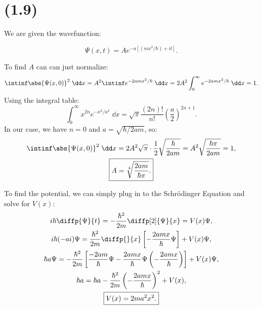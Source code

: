 \section{(1.9)}

We are given the wavefunction:

\begin{equation}
    \Psi(x,t) = Ae^{-a[(mx^2/\hbar) + it]}.
\end{equation}

\begin{parts}
    \item To find $A$ can can just normalize:
        \begin{equation*}
            \intinf \abs{\Psi(x,0)}^2 \;\dd x = A^2 \intinf e^{-2amx^2/\hbar}\;\dd x = 2A^2 \int_0^{\infty} e^{-2amx^2/\hbar} \;\dd x = 1.
        \end{equation*}
        Using the integral table:
        \begin{equation}
            \int_0^{\infty} x^{2n} e^{-x^2/a^2} \;\dd x = \sqrt{\pi} \frac{(2n)!}{n!} \left(\frac{a}{2}\right)^{2n+1}.\label{Prblm2GaussIntegral}
        \end{equation}
        In our case, we have $n=0$ and $a = \sqrt{\hbar/2am}$, so:
        \begin{gather*}
            \intinf \abs{\Psi(x,0)}^2 \;\dd x = 2A^2 \sqrt{\pi} \cdot \frac{1}{2} \sqrt{\frac{\hbar}{2am}} = A^2 \sqrt{\frac{\hbar\pi}{2am}} = 1, \\
            \boxed{A = \sqrt[4]{\frac{2am}{\hbar\pi}}.}
        \end{gather*}

    \item To find the potential, we can simply plug in to the Schr\"odinger Equation and solve for $V(x)$:
        \begin{gather*}
            i\hbar \diffp{\Psi}{t} = -\frac{\hbar^2}{2m} \diffp[2]{\Psi}{x} = V(x)\Psi, \\
            i\hbar (-ai) \Psi = \frac{\hbar^2}{2m} \diffp{}{x} \left[-\frac{2amx}{\hbar}\Psi\right] + V(x)\Psi, \\
            \hbar a \Psi = -\frac{\hbar^2}{2m} \left[\frac{-2am}{\hbar}\Psi - \frac{2amx}{\hbar}\Psi \left(-\frac{2amx}{\hbar}\right)\right] + V(x)\Psi, \\
            \hbar a = \hbar a -\frac{\hbar^2}{2m}\left(-\frac{2amx}{\hbar}\right)^2 + V(x), \\
            \boxed{V(x) = 2ma^2x^2.}
        \end{gather*}


\end{parts}
